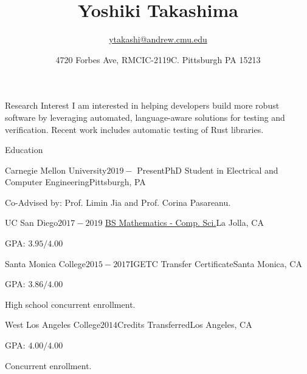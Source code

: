\documentclass{resume} %
\title{\bf Yoshiki Takashima}
\author{\href{ytakashi@andrew.cmu.edu}{ytakashi@andrew.cmu.edu}}
\date{4720 Forbes Ave, RMCIC-2119C. Pittsburgh PA 15213}
\begin{document}
\maketitle

\begin{rSection}{Research Interest}
  I am interested in helping developers build more robust software by
  leveraging automated, language-aware solutions for testing and
  verification. Recent work includes automatic testing of Rust libraries.
\end{rSection}

\begin{rSection}{Education}
  \begin{rSubsection}{Carnegie Mellon University}{$2019 -$
      Present}{PhD Student in Electrical and Computer
      Engineering}{Pittsburgh, PA}
  \item Co-Advised by: Prof. Limin Jia and Prof. Corina Pasareanu.
  \end{rSubsection}

  \begin{rSubsection}{UC San Diego}{$2017 -
      2019$}{
      \href{https://www.math.ucsd.edu/~handbook/undergraduate/ma30-math-computer-science-b-s/}
      {BS Mathematics - Comp. Sci.}}{La Jolla, CA}
  \item GPA: $3.95/4.00$
  \end{rSubsection}

  \begin{rSubsection}{Santa Monica College}{$2015 -
      2017$}{IGETC Transfer Certificate}{Santa Monica, CA}
  \item GPA: $3.86/4.00$
  \item High school concurrent enrollment.
  \end{rSubsection}

  \begin{rSubsection}{West Los Angeles College}{$2014$}{Credits
      Transferred}{Los Angeles, CA}
  \item GPA: $4.00/4.00$
  \item Concurrent enrollment.
  \end{rSubsection}
\end{rSection}
\end{document}

